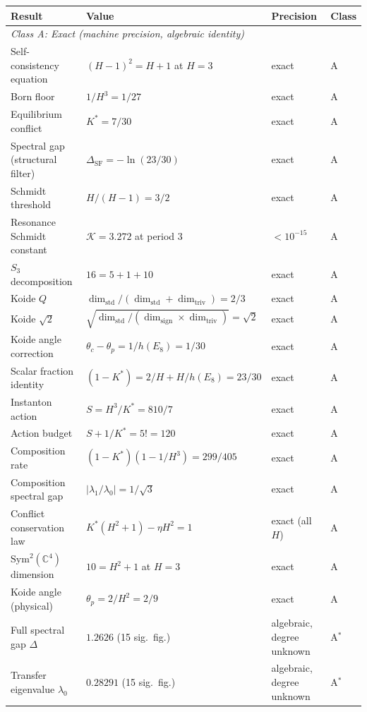 \documentclass[11pt,a4paper]{article}
\theoremstyle{definition}
\theoremstyle{remark}
\newcommand{\C}{\mathbb{C}}
\begin{document}
\bigskip
\begin{center}
\renewcommand{\arraystretch}{1.15}
\begin{tabular}{llll}
\toprule
\textbf{Result} & \textbf{Value} & \textbf{Precision} & \textbf{Class} \\
\midrule
\multicolumn{4}{l}{\textit{Class A: Exact (machine precision, algebraic identity)}} \\[3pt]
Self-consistency equation & $(H-1)^2 = H+1$ at $H=3$ & exact & A \\
Born floor & $1/H^3 = 1/27$ & exact & A \\
Equilibrium conflict & $K^* = 7/30$ & exact & A \\
Spectral gap (structural filter) & $\Delta_{\mathrm{SF}} = -\ln(23/30)$ & exact & A \\
Schmidt threshold & $H/(H-1) = 3/2$ & exact & A \\
Resonance Schmidt constant & $\mathcal{K} = 3.272$ at period $3$ & $< 10^{-15}$ & A \\
$S_3$ decomposition & $16 = 5 + 1 + 10$ & exact & A \\
Koide $Q$ & $\dim_{\mathrm{std}}/(\dim_{\mathrm{std}}+\dim_{\mathrm{triv}}) = 2/3$ & exact & A \\
Koide $\sqrt{2}$ & $\sqrt{\dim_{\mathrm{std}}/(\dim_{\mathrm{sign}}\times\dim_{\mathrm{triv}})} = \sqrt{2}$ & exact & A \\
Koide angle correction & $\theta_c - \theta_p = 1/h(E_8) = 1/30$ & exact & A \\
Scalar fraction identity & $(1-K^*) = 2/H + H/h(E_8) = 23/30$ & exact & A \\
Instanton action & $S = H^3/K^* = 810/7$ & exact & A \\
Action budget & $S + 1/K^* = 5! = 120$ & exact & A \\
Composition rate & $(1-K^*)(1-1/H^3) = 299/405$ & exact & A \\
Composition spectral gap & $|\lambda_1/\lambda_0| = 1/\sqrt{3}$ & exact & A \\
Conflict conservation law & $K^*(H^2+1) - \eta H^2 = 1$ & exact (all $H$) & A \\
$\mathrm{Sym}^2(\C^4)$ dimension & $10 = H^2 + 1$ at $H=3$ & exact & A \\
Koide angle (physical) & $\theta_p = 2/H^2 = 2/9$ & exact & A \\
Full spectral gap $\Delta$ & $1.2626$ (15 sig.~fig.) & algebraic, degree unknown & A$^*$ \\
Transfer eigenvalue $\lambda_0$ & $0.28291$ (15 sig.~fig.) & algebraic, degree unknown & A$^*$ \\

\end{tabular}
\end{center}
\end{document}
